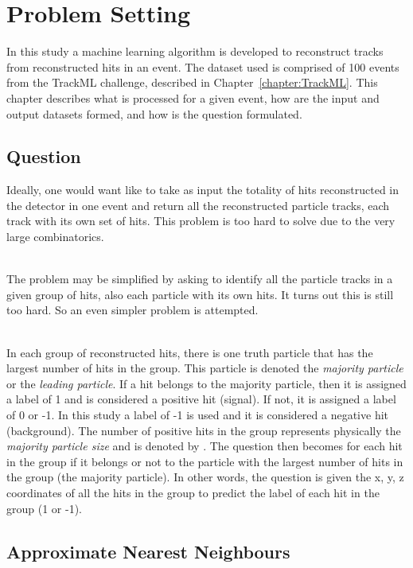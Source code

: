 \chapter{Problem Setting}
\label{chapter:ProblemSetting}

In this study a machine learning algorithm is developed to reconstruct tracks from reconstructed hits in an event. The dataset used is comprised of 100 events from the TrackML challenge, described in Chapter~\ref{chapter:TrackML}. This chapter describes what is processed for a given event, how are the input and output datasets formed, and how is the question formulated.

\section{Question}
\label{sec:Question}

Ideally, one would want like to take as input the totality of hits reconstructed in the detector in one event and return all the reconstructed particle tracks, each track with its own set of hits. This problem is too hard to solve due to the very large combinatorics. 

\ \\The problem may be simplified by asking to identify all the particle tracks in a given group of hits, also each particle with its own hits. It turns out this is still too hard. So an even simpler problem is attempted. 

\ \\In each group of reconstructed hits, there is one truth particle that has the largest number of hits in the group. This particle is denoted the \emph{majority particle} or the \emph{leading particle}. If a hit belongs to the majority particle, then it is assigned a label of 1 and is considered a positive hit (signal). If not, it is assigned a label of 0 or -1. In this study a label of -1 is used and it is considered a negative hit (background). The number of positive hits in the group represents physically the \emph{majority particle size} and is denoted by \nbPositiveHit. The question then becomes for each hit in the group if it belongs or not to the particle with the largest number of hits in the group (the majority particle). In other words, the question is given the x, y, z coordinates of all the hits in the group to predict the label of each hit in the group (1 or -1).

\section{Approximate Nearest Neighbours}
\label{sec:Approximate Nearest Neighbours}


